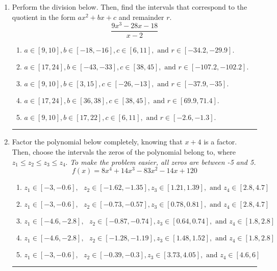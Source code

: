 \documentclass[14pt]{extbook}
\newcommand{\litem}[1]{\item#1\hspace*{-1cm}\rule{\textwidth}{0.4pt}}
\begin{document}
\begin{enumerate}
{\begin{enumerate}[label=\Alph*.]
\end{enumerate} }
\litem{
Perform the division below. Then, find the intervals that correspond to the quotient in the form $ax^2+bx+c$ and remainder $r$.\[ \frac{9x^{3} -28 x -18}{x -2} \]\begin{enumerate}[label=\Alph*.]
\item \( a \in [9, 10], b \in [-18, -16], c \in [6, 11], \text{ and } r \in [-34.2, -29.9]. \)
\item \( a \in [17, 24], b \in [-43, -33], c \in [38, 45], \text{ and } r \in [-107.2, -102.2]. \)
\item \( a \in [9, 10], b \in [3, 15], c \in [-26, -13], \text{ and } r \in [-37.9, -35]. \)
\item \( a \in [17, 24], b \in [36, 38], c \in [38, 45], \text{ and } r \in [69.9, 71.4]. \)
\item \( a \in [9, 10], b \in [17, 22], c \in [6, 11], \text{ and } r \in [-2.6, -1.3]. \)

\end{enumerate} }
\litem{
Factor the polynomial below completely, knowing that $x+4$ is a factor. Then, choose the intervals the zeros of the polynomial belong to, where $z_1 \leq z_2 \leq z_3 \leq z_4$. \textit{To make the problem easier, all zeros are between -5 and 5.}\[ f(x) = 8x^{4} +14 x^{3} -83 x^{2} -14 x + 120 \]\begin{enumerate}[label=\Alph*.]
\item \( z_1 \in [-3, -0.6], \text{   }  z_2 \in [-1.62, -1.35], z_3 \in [1.21, 1.39], \text{   and   } z_4 \in [2.8, 4.7] \)
\item \( z_1 \in [-3, -0.6], \text{   }  z_2 \in [-0.73, -0.57], z_3 \in [0.78, 0.81], \text{   and   } z_4 \in [2.8, 4.7] \)
\item \( z_1 \in [-4.6, -2.8], \text{   }  z_2 \in [-0.87, -0.74], z_3 \in [0.64, 0.74], \text{   and   } z_4 \in [1.8, 2.8] \)
\item \( z_1 \in [-4.6, -2.8], \text{   }  z_2 \in [-1.28, -1.19], z_3 \in [1.48, 1.52], \text{   and   } z_4 \in [1.8, 2.8] \)
\item \( z_1 \in [-3, -0.6], \text{   }  z_2 \in [-0.39, -0.3], z_3 \in [3.73, 4.05], \text{   and   } z_4 \in [4.6, 6] \)


\end{enumerate}}
\end{enumerate}
\end{document}
